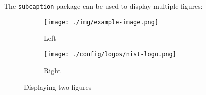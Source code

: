 
\begin{sectionslide}
  The \texttt{subcaption} package can be used to display multiple figures:

  \begin{figure}[p]
    \centering
    \begin{subfigure}{.49\linewidth}
      \centering
      \texttt{[image: ./img/example-image.png]}
      \caption{Left}
    \end{subfigure}
    \hfill
    \begin{subfigure}{.49\linewidth}
      \centering
      \texttt{[image: ./config/logos/nist-logo.png]}
      \caption{Right}
    \end{subfigure}
    \caption{Displaying two figures}
  \end{figure}
\end{sectionslide}
